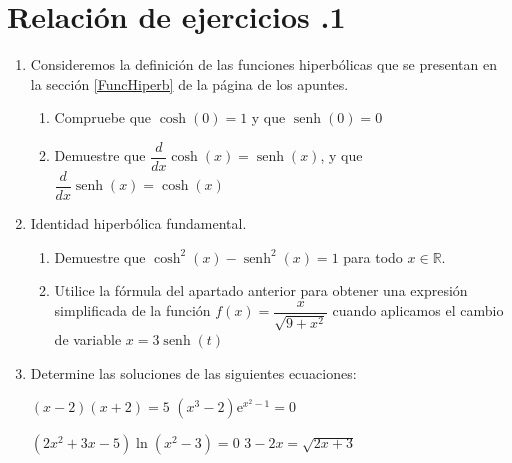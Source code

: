 \newpage

%
%

\section*{Relación de ejercicios \thechapter.1}

\pagestyle{relaciones}

\begin{enumerate}

\item
Consideremos la definición de las funciones hiperbólicas que se presentan en la sección \ref{FuncHiperb} de la página \pageref{FuncHiperb} de los apuntes.
\begin{enumerate}
\item
Compruebe que $\cosh(0)=1$ y que $\operatorname{senh}(0)=0$ 
\item
Demuestre que $\dfrac{d}{dx}\cosh(x)=\operatorname{senh}(x)$, y que $\dfrac{d}{dx}\operatorname{senh}(x)=\cosh(x)$
\end{enumerate}



\item 
Identidad hiperbólica fundamental.
\begin{enumerate}
\item 
Demuestre que $\cosh^2(x)-\operatorname{senh}^2(x)=1$ para todo $x\in\mathbb{R}$.    
\item
Utilice la fórmula del apartado anterior para obtener una expresión simplificada de la función $f(x)=\dfrac{x}{\sqrt{9+x^2}}$ cuando aplicamos el cambio de variable $x=3\operatorname{senh}(t)$
\end{enumerate}



\item Determine las soluciones de las siguientes ecuaciones:
\setcontadoralph
\begin{centrar}
\nitem
\(
(x-2)(x+2)=5
\)
\hfill
\nitem
\(
(x^3-2)\mbox{e}^{x^2-1}=0
\)
\end{centrar}
\begin{centrar}
\nitem
\(
(2x^2+3x-5)\ln(x^2-3)=0
\)
\hfill
\nitem
\(
3-2x = \sqrt{2x+3}
\)
\end{centrar}



\end{enumerate}
